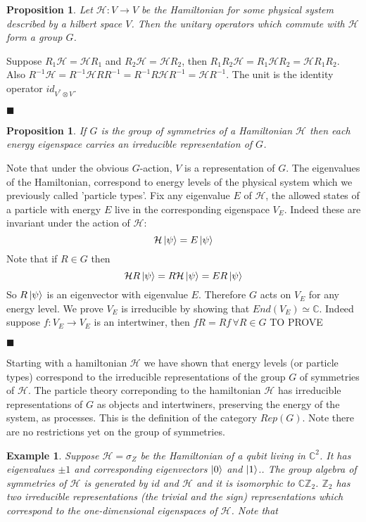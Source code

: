 \documentclass{article}
\newtheorem{example}{Example}
\newtheorem{proposition}[theorem]{Proposition}
\newenvironment{proof}[1][Proof]{\begin{trivlist}
\item[\hskip \labelsep {\bfseries #1}]}{\begin{flushright}$\blacksquare$\end{flushright} \end{trivlist}}
\newcommand{\ham}{\mathcal{H}}
\begin{document}
\begin{proposition}
Let $\mathcal{H}:V\rightarrow V$ be the Hamiltonian for some physical system described by a hilbert space $V$. Then the unitary operators which commute with $\mathcal{H}$ form a group $G$.
\end{proposition}
\begin{proof}
Suppose $R_1\ham=\ham R_1$ and $R_2\ham=\ham R_2$, then $R_1R_2\ham=R_1\ham R_2 = \ham R_1R_2$. Also $R^{-1}\ham = R^{-1}\ham RR^{-1} = R^{-1}R\ham R^{-1} =\ham R^{-1}$. The unit is the identity operator $id_{V^*\otimes V}$.
\end{proof}

\begin{proposition}
If $G$ is the group of symmetries of a Hamiltonian $\mathcal{H}$ then each energy eigenspace carries an irreducible representation of $G$.
\end{proposition}
\begin{proof}
Note that under the obvious $G$-action, $V$ is a representation of $G$. 
The eigenvalues of the Hamiltonian, correspond to energy levels of the physical system which we previously called 'particle types'. Fix any eigenvalue $E$ of $\ham$, the allowed states of a particle with energy $E$ live in the corresponding eigenspace $V_E$. Indeed these are invariant under the action of $\ham$:
$$ \ham \ket{\psi}= E\ket{\psi}$$
Note that if $R\in G$ then
$$ \ham R \ket{\psi}=R\ham \ket{\psi}=ER\ket{\psi}$$
So $R\ket{\psi}$ is an eigenvector with eigenvalue $E$. Therefore $G$ acts on $V_E$ for any energy level.
We prove $V_E$ is irreducible by showing that $End(V_E) \simeq \mathbb{C}$. Indeed suppose $f:V_E \rightarrow V_E$ is an intertwiner, then $fR=Rf \, \forall R \in G$
TO PROVE
\end{proof}
Starting with a hamiltonian $\ham$ we have shown that energy levels (or particle types) correspond to the irreducible representations of the group $G$ of symmetries of $\ham$. The particle theory correponding to the hamiltonian $\ham$ has irreducible representations of $G$ as objects and intertwiners, preserving the energy of the system, as processes. This is the definition of the category $Rep(G)$. Note there are no restrictions yet on the group of symmetries.
\begin{example}
Suppose $\ham = \sigma_Z$ be the Hamiltonian of a qubit living in $\mathbb{C}^2$. It has eigenvalues $\pm1$ and corresponding eigenvectors $\ket{0}$ and $\ket{1}$.. The group algebra of symmetries of $\ham$ is generated by $id$ and $\ham$ and it is isomorphic to $\mathbb{C}\mathbb{Z}_2$. $\mathbb{Z}_2$ has two irreducible representations (the trivial and the sign) representations which correspond to the one-dimensional eigenspaces of $\ham$. Note that 
\end{example}
\end{document}
